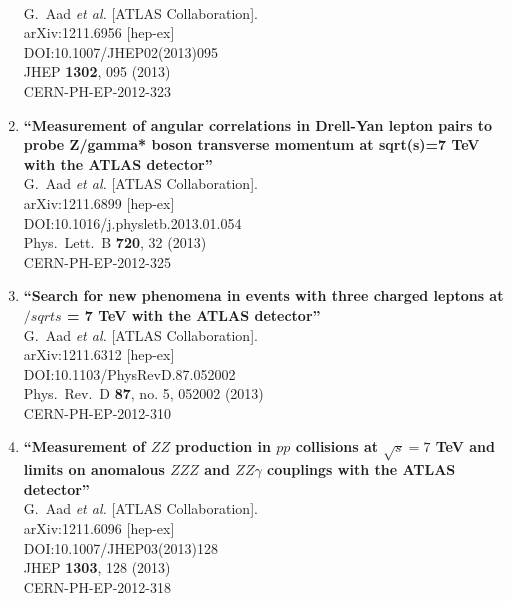 \documentclass{article}
\begin{document}
\begin{enumerate}
  \\{}G.~Aad {\it et al.} [ATLAS Collaboration].
  \\{}arXiv:1211.6956 [hep-ex]
  \\{}DOI:10.1007/JHEP02(2013)095
  \\{}JHEP {\bf 1302}, 095 (2013)
  \\{}CERN-PH-EP-2012-323
\item%
{\bf ``Measurement of angular correlations in Drell-Yan lepton pairs to probe Z/gamma* boson transverse momentum at sqrt(s)=7 TeV with the ATLAS detector''}
  \\{}G.~Aad {\it et al.} [ATLAS Collaboration].
  \\{}arXiv:1211.6899 [hep-ex]
  \\{}DOI:10.1016/j.physletb.2013.01.054
  \\{}Phys.\ Lett.\ B {\bf 720}, 32 (2013)
  \\{}CERN-PH-EP-2012-325
\item%
{\bf ``Search for new phenomena in events with three charged leptons at $/sqrt{s}$ = 7 TeV with the ATLAS detector''}
  \\{}G.~Aad {\it et al.} [ATLAS Collaboration].
  \\{}arXiv:1211.6312 [hep-ex]
  \\{}DOI:10.1103/PhysRevD.87.052002
  \\{}Phys.\ Rev.\ D {\bf 87}, no. 5, 052002 (2013)
  \\{}CERN-PH-EP-2012-310
\item%
{\bf ``Measurement of $ZZ$ production in $pp$ collisions at $\sqrt{s}=7$ TeV and limits on anomalous $ZZZ$ and $ZZ\gamma$ couplings with the ATLAS detector''}
  \\{}G.~Aad {\it et al.} [ATLAS Collaboration].
  \\{}arXiv:1211.6096 [hep-ex]
  \\{}DOI:10.1007/JHEP03(2013)128
  \\{}JHEP {\bf 1303}, 128 (2013)
  \\{}CERN-PH-EP-2012-318

\end{enumerate}
\end{document}
